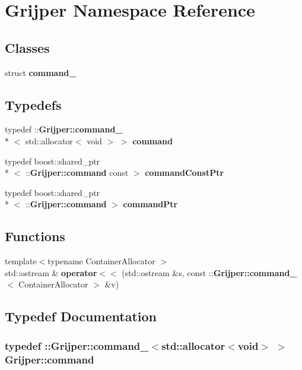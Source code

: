 \section{Grijper Namespace Reference}
\label{namespaceGrijper}
\subsection*{Classes}
\begin{DoxyCompactItemize}
\item 
struct {\bf command\-\_\-}
\end{DoxyCompactItemize}
\subsection*{Typedefs}
\begin{DoxyCompactItemize}
\item 
typedef \-::{\bf Grijper\-::command\-\_\-}\\*
$<$ std\-::allocator$<$ void $>$ $>$ {\bf command}
\item 
typedef boost\-::shared\-\_\-ptr\\*
$<$ \-::{\bf Grijper\-::command} const  $>$ {\bf command\-Const\-Ptr}
\item 
typedef boost\-::shared\-\_\-ptr\\*
$<$ \-::{\bf Grijper\-::command} $>$ {\bf command\-Ptr}
\end{DoxyCompactItemize}
\subsection*{Functions}
\begin{DoxyCompactItemize}
\item 
{\footnotesize template$<$typename Container\-Allocator $>$ }\\std\-::ostream \& {\bf operator$<$$<$} (std\-::ostream \&s, const \-::{\bf Grijper\-::command\-\_\-}$<$ Container\-Allocator $>$ \&v)
\end{DoxyCompactItemize}


\subsection{Typedef Documentation}
\subsubsection[{command}]{\setlength{\rightskip}{0pt plus 5cm}typedef \-::{\bf Grijper\-::command\-\_\-}$<$std\-::allocator$<$void$>$ $>$ {\bf Grijper\-::command}}\label{namespaceGrijper_a0366861a04233d7213a655f01bb7068a}


